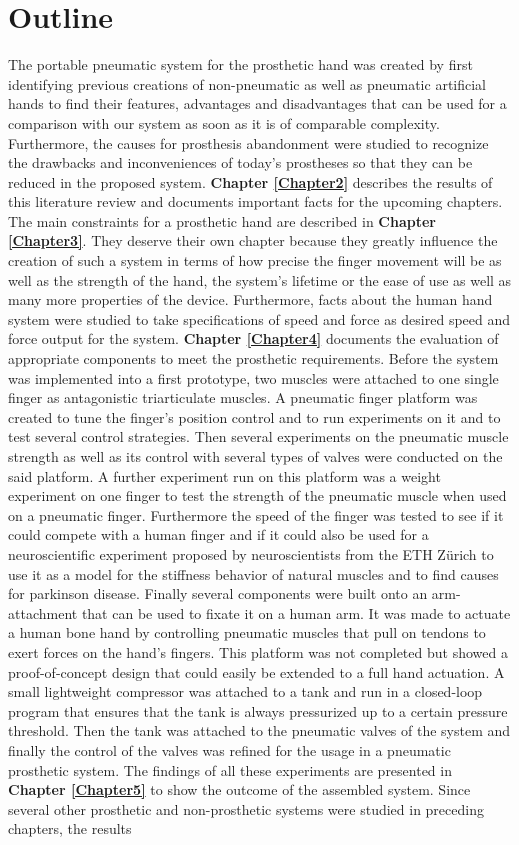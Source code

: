 \documentclass[main]{subfiles}
\begin{document}
\section{Outline}
The portable pneumatic system for the prosthetic hand was created by first identifying previous creations of non-pneumatic as well as pneumatic artificial hands to find their features, advantages and disadvantages that can be used for a comparison with our system as soon as it is of comparable complexity. Furthermore, the causes for prosthesis abandonment were studied to recognize the drawbacks and inconveniences of today's prostheses so that they can be reduced in the proposed system. \textbf{Chapter \ref{Chapter2}} describes the results of this literature review and documents important facts for the upcoming chapters. The main constraints for a prosthetic hand are described in \textbf{Chapter \ref{Chapter3}}. They deserve their own chapter because they greatly influence the creation of such a system in terms of how precise the finger movement will be as well as the strength of the hand, the system's lifetime or the ease of use as well as many more properties of the device. Furthermore, facts about the human hand system were studied to take specifications of speed and force as desired speed and force output for the system. \textbf{Chapter \ref{Chapter4}} documents the evaluation of appropriate components to meet the prosthetic requirements. Before the system was implemented into a first prototype, two muscles were attached to one single finger as antagonistic triarticulate muscles. A pneumatic finger platform was created to tune the finger's position control and to run experiments on it and to test several control strategies. Then several experiments on the pneumatic muscle strength as well as its control with several types of valves were conducted on the said platform. A further experiment run on this platform was a weight experiment on one finger to test the strength of the pneumatic muscle when used on a pneumatic finger. Furthermore the speed of the finger was tested to see if it could compete with a human finger and if it could also be used for a neuroscientific experiment proposed by neuroscientists from the ETH Zürich to use it as a model for the stiffness behavior of natural muscles and to find causes for parkinson disease. Finally several components were built onto an arm-attachment that can be used to fixate it on a human arm. It was made to actuate a human bone hand by controlling pneumatic muscles that pull on tendons to exert forces on the hand's fingers. This platform was not completed but showed a proof-of-concept design that could easily be extended to a full hand actuation. A small lightweight compressor was attached to a tank and run in a closed-loop program that ensures that the tank is always pressurized up to a certain pressure threshold. Then the tank was attached to the pneumatic valves of the system and finally the control of the valves was refined for the usage in a pneumatic prosthetic system. The findings of all these experiments are presented in \textbf{Chapter \ref{Chapter5}} to show the outcome of the assembled system. Since several other prosthetic and non-prosthetic systems were studied in preceding chapters, the results 
\end{document}
